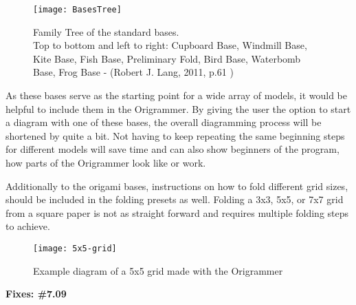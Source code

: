  \begin{figure}[htbp]
	\centering
	\texttt{[image: BasesTree]}
	\caption[Family Tree of the standard bases.\\
	Top to bottom and left to right:  Cupboard Base, Windmill Base, Kite Base, Fish Base, Preliminary Fold, Bird Base, Waterbomb Base, Frog Base]{Family Tree of the standard bases.\\
	Top to bottom and left to right:  Cupboard Base, Windmill Base, Kite Base, Fish Base, Preliminary Fold, Bird Base, Waterbomb Base, Frog Base - (Robert J. Lang, 2011, p.61 \cite{BaseTree})}
	\label{fig:basesTree}
\end{figure}

\noindent As these bases serve as the starting point for a wide array of models, it would be helpful to include them in the Origrammer. By giving the user the option to start a diagram with one of these bases, the overall diagramming process will be shortened by quite a bit. Not having to keep repeating the same beginning steps for different models will save time and can also show beginners of the program, how parts of the Origrammer look like or work.

Additionally to the origami bases, instructions on how to fold different grid sizes, should be included in the folding presets as well. Folding a 3x3, 5x5, or 7x7 grid from a square paper is not as straight forward and requires multiple folding steps to achieve. 

 \begin{figure}[htbp]
	\centering
	\texttt{[image: 5x5-grid]}
	\caption{Example diagram of a 5x5 grid made with the Origrammer}
	\label{fig:5x5-grid}
\end{figure}

\textbf{Fixes: \#7.09}
